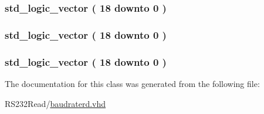 \subsubsection[{N\+B}]{ {\bfseries \textcolor{comment}{std\+\_\+logic\+\_\+vector}\textcolor{vhdlchar}{ }\textcolor{vhdlchar}{(}\textcolor{vhdlchar}{ }\textcolor{vhdlchar}{ } \textcolor{vhdldigit}{18} \textcolor{vhdlchar}{ }\textcolor{keywordflow}{downto}\textcolor{vhdlchar}{ }\textcolor{vhdlchar}{ } \textcolor{vhdldigit}{0} \textcolor{vhdlchar}{ }\textcolor{vhdlchar}{)}\textcolor{vhdlchar}{ }} \hspace{0.3cm}{\ttfamily [Signal]}}\label{class_baud_rate_r_d_1_1simple_a5033df697b3b093f7df25224f8343c25}
\hypertarget{class_baud_rate_r_d_1_1simple_a4918b47ab83d6ff869ec1a9bda3866dd}{}
\subsubsection[{Qn}]{ {\bfseries \textcolor{comment}{std\+\_\+logic\+\_\+vector}\textcolor{vhdlchar}{ }\textcolor{vhdlchar}{(}\textcolor{vhdlchar}{ }\textcolor{vhdlchar}{ } \textcolor{vhdldigit}{18} \textcolor{vhdlchar}{ }\textcolor{keywordflow}{downto}\textcolor{vhdlchar}{ }\textcolor{vhdlchar}{ } \textcolor{vhdldigit}{0} \textcolor{vhdlchar}{ }\textcolor{vhdlchar}{)}\textcolor{vhdlchar}{ }} \hspace{0.3cm}{\ttfamily [Signal]}}\label{class_baud_rate_r_d_1_1simple_a4918b47ab83d6ff869ec1a9bda3866dd}
\hypertarget{class_baud_rate_r_d_1_1simple_a193e599da42febaea5351ec3bb05dc52}{}
\subsubsection[{Qp}]{ {\bfseries \textcolor{comment}{std\+\_\+logic\+\_\+vector}\textcolor{vhdlchar}{ }\textcolor{vhdlchar}{(}\textcolor{vhdlchar}{ }\textcolor{vhdlchar}{ } \textcolor{vhdldigit}{18} \textcolor{vhdlchar}{ }\textcolor{keywordflow}{downto}\textcolor{vhdlchar}{ }\textcolor{vhdlchar}{ } \textcolor{vhdldigit}{0} \textcolor{vhdlchar}{ }\textcolor{vhdlchar}{)}\textcolor{vhdlchar}{ }} \hspace{0.3cm}{\ttfamily [Signal]}}\label{class_baud_rate_r_d_1_1simple_a193e599da42febaea5351ec3bb05dc52}


The documentation for this class was generated from the following file\+:\begin{DoxyCompactItemize}
\item 
R\+S232\+Read/\hyperlink{baudraterd_8vhd}{baudraterd.\+vhd}\end{DoxyCompactItemize}
